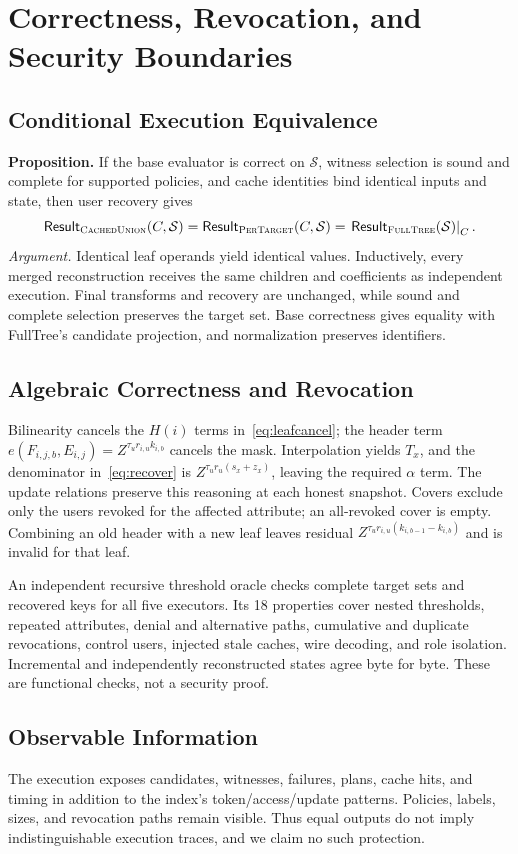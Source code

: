 \documentclass[runningheads]{llncs}
\newif\ifmarkrevisions
\newenvironment{revision}{\par\begingroup\ifmarkrevisions\color{RevisionBlue}\fi}{\par\endgroup}
\newcommand{\PT}{\textsc{PerTarget}}
\newcommand{\CU}{\textsc{CachedUnion}}
\newcommand{\FT}{\textsc{FullTree}}
\newcommand{\PolicyState}{\mathcal S}
\newcommand{\Result}{\mathsf{Result}}
\begin{document}
\section{Correctness, Revocation, and Security Boundaries}
\begin{revision}
\subsection{Conditional Execution Equivalence}
\noindent\textbf{Proposition.}
If the base evaluator is correct on $\PolicyState$, witness selection is sound
and complete for supported policies, and cache identities bind identical
inputs and state, then user recovery gives
\[
 \Result_{\CU}(C,\PolicyState)=\Result_{\PT}(C,\PolicyState)
                  =\left.\Result_{\FT}(\PolicyState)\right|_C.
\]
\noindent\emph{Argument.}
Identical leaf operands yield identical values. Inductively, every merged
reconstruction receives the same children and coefficients as independent
execution. Final transforms and recovery are unchanged, while sound and
complete selection preserves the target set. Base correctness gives equality
with FullTree's candidate projection, and normalization preserves identifiers.

\subsection{Algebraic Correctness and Revocation}
Bilinearity cancels the $H(i)$ terms in~\eqref{eq:leafcancel}; the header term
$e(F_{i,j,b},E_{i,j})=Z^{\tau_u r_{i,u}k_{i,b}}$ cancels the mask.
Interpolation yields $T_x$, and the denominator in~\eqref{eq:recover} is
$Z^{\tau_u r_u(s_x+z_x)}$, leaving the required $\alpha$ term. The update
relations preserve this reasoning at each honest snapshot. Covers exclude
only the users revoked for the affected attribute; an all-revoked cover is
empty. Combining an old header with a new leaf leaves residual
$Z^{\tau_u r_{i,u}(k_{i,b-1}-k_{i,b})}$ and is invalid for that leaf.

An independent recursive threshold oracle checks complete target sets and
recovered keys for all five executors. Its 18 properties cover nested
thresholds, repeated attributes, denial and alternative paths, cumulative
and duplicate revocations, control users, injected stale caches, wire
decoding, and role isolation. Incremental and independently reconstructed
states agree byte for byte. These are functional checks, not a security proof.

\subsection{Observable Information}
The execution exposes candidates, witnesses, failures, plans, cache hits, and
timing in addition to the index's token/access/update patterns. Policies,
labels, sizes, and revocation paths remain visible. Thus equal outputs do not
imply indistinguishable execution traces, and we claim no such protection.
\end{revision}
\end{document}
